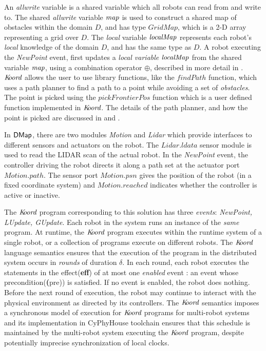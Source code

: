  An \emph{allwrite} variable is a shared variable which all robots can read from and write to. The shared \emph{allwrite} variable $\mathit{map}$ is used to construct a shared map of obstacles within the domain $D$, and has type $\mathit{GridMap}$, which is a 2-D array representing a grid over $D$. The \emph{local} variable $\mathit{localMap}$ represents each robot's \emph{local} knowledge of the domain $D$, and has the same type as $D$. A robot executing the \emph{NewPoint} event, first updates a \emph{local variable} $\mathit{localMap}$ from the shared variable $\mathit{map}$, using a combination operator $\oplus$, described in more detail in . $\emph{K\kern-2pt oord}$ allows the user to use library functions, like the $\mathit{findPath}$ function, which uses a path planner to find a path to a point while avoiding a set of \emph{obstacles}. The point is picked using the $\mathit{pickFrontierPos}$ function which is a user defined function implemented in $\emph{K\kern-2pt oord}$. The details of the path planner, and how the point is picked are discussed in and  .

In ${\sf DMap}$, there are two modules \emph{Motion} and \emph{Lidar} which provide interfaces to different sensors and actuators on the robot. The $\mathit{Lidar.ldata}$ sensor module is used to read the LIDAR scan of the actual robot. In the \emph{NewPoint} event, the controller driving the robot directs it along a path set at the actuator port $\mathit{Motion.path}$. The sensor port $\mathit{Motion.psn}$ gives the position of the robot (in a fixed coordinate system) and $\mathit{Motion.reached}$ indicates whether the controller is active or inactive.

The $\emph{K\kern-2pt oord}$ program corresponding to this solution has three \emph{events}: \emph{NewPoint, LUpdate, GUpdate}. Each robot in the system runs an instance of the \emph{same} program. At runtime, the $\emph{K\kern-2pt oord}$ program executes within the runtime system of a single robot, or a collection of programs execute on different robots. The $\emph{K\kern-2pt oord}$ language semantics ensures that the execution of the program in the distributed system occurs in \emph{rounds} of duration $\delta$. In each round, each robot executes the statements in the effect(\textbf{eff}) of at most one \emph{enabled} event : an event whose precondition(\textbf(pre)) is satisfied. If no event is enabled, the robot does nothing. Before the next round of execution, the robot may continue to interact with the physical environment as directed by its controllers. The $\emph{K\kern-2pt oord}$ semantics imposes a synchronous model of execution for $\emph{K\kern-2pt oord}$ programs for multi-robot systems and its implementation in CyPhyHouse toolchain ensures that this schedule is maintained by the multi-robot system executing the $\emph{K\kern-2pt oord}$ program, despite potentially imprecise synchronization of local clocks.

